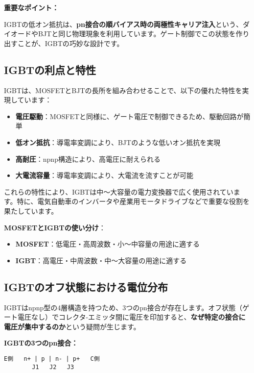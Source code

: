 \textbf{重要なポイント：}

IGBTの低オン抵抗は、\textbf{pn接合の順バイアス時の両極性キャリア注入}という、ダイオードやBJTと同じ物理現象を利用しています。ゲート制御でこの状態を作り出すことが、IGBTの巧妙な設計です。

\subsection{IGBTの利点と特性}

IGBTは、MOSFETとBJTの長所を組み合わせることで、以下の優れた特性を実現しています：

\begin{itemize}
\item \textbf{電圧駆動}：MOSFETと同様に、ゲート電圧で制御できるため、駆動回路が簡単
\item \textbf{低オン抵抗}：導電率変調により、BJTのような低いオン抵抗を実現
\item \textbf{高耐圧}：npnp構造により、高電圧に耐えられる
\item \textbf{大電流容量}：導電率変調により、大電流を流すことが可能
\end{itemize}

これらの特性により、IGBTは中～大容量の電力変換器で広く使用されています。特に、電気自動車のインバータや産業用モータドライブなどで重要な役割を果たしています。

\textbf{MOSFETとIGBTの使い分け}：

\begin{itemize}
\item \textbf{MOSFET}：低電圧・高周波数・小～中容量の用途に適する
\item \textbf{IGBT}：高電圧・中周波数・中～大容量の用途に適する
\end{itemize}

\subsection{IGBTのオフ状態における電位分布}

IGBTはnpnp型の4層構造を持つため、3つのpn接合が存在します。オフ状態（ゲート電圧なし）でコレクタ-エミッタ間に電圧を印加すると、\textbf{なぜ特定の接合に電圧が集中するのか}という疑問が生じます。

\textbf{IGBTの3つのpn接合：}

\begin{verbatim}
E側   n+ | p | n- | p+   C側
        J1   J2   J3
\end{verbatim}

